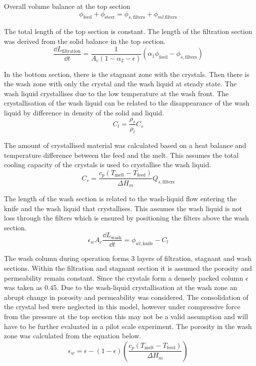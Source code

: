 Overall volume balance at the top section 
\begin{equation}
\phi_{\mathrm{feed}}+\phi_{\mathrm{steer}}=\phi_{s,\mathrm{filters}}+\phi_{ml.\mathrm{filters}}
\end{equation}

The total length of the top section is constant. The length of the filtration section was derived from the solid balance in the top section. 
\begin{equation}
\frac{\dd L_{\mathrm{filtration}}}{\dd t} = \frac{1}{A_c(1-\alpha_2-\epsilon)}(\alpha_1\phi_{\mathrm{feed}}-\phi_{s,\mathrm{filters}})
\end{equation}

In the bottom section, there is the stagnant zone with the crystals. Then there is the wash zone with only the crystal and the wash liquid at steady state. The wash liquid crystallises due to the low temperature at the wash front. The crystallisation of the wash liquid can be related to the disappearance of the wash liquid by difference in density of the solid and liquid.
\begin{equation}
C_l= \frac{\rho_s}{\rho_l}C_s
\end{equation}

The amount of crystallised material was calculated based on a heat balance and temperature difference between the feed and the melt. This assumes the total cooling capacity of the crystals is used to crystallise the wash liquid. 
\begin{equation}
C_s= \frac{c_p(T_{\mathrm{melt}}-T_{\mathrm{feed}})}{\Delta H_m}Q_{s,\mathrm{filters}}
\end{equation}

The length of the wash section is related to the wash-liquid flow entering the knife and the wash liquid that crystallises. This assumes the wash liquid is not loss through the filters which is ensured by positioning the filters above the wash section.
\begin{equation}
\epsilon_w A_c \frac{\dd L_{\mathrm{wash}}}{\dd t}= \phi_{wl,\mathrm{knife}}-C_l
\end{equation}

The wash column during operation forms 3 layers of filtration, stagnant and wash sections. Within the filtration and stagnant section it is assumed the porosity and permeability remain constant. Since the crystals form a densely packed column $\epsilon$ was taken as 0.45. Due to the wash-liquid crystallisation at the wash zone an abrupt change in porosity and permeability was considered. The consolidation of the crystal bed were neglected in this model, however under compressive force from the pressure at the top section this may not be a valid assumption and will have to be further evaluated in a pilot scale experiment. The porosity in the wash zone was calculated from the equation below. 
\begin{equation}
\epsilon_{w}= \epsilon-(1-\epsilon)\left(\frac{c_p(T_{\mathrm{melt}}-T_{\mathrm{feed}})}{\Delta H_m}\right)
\end{equation}

